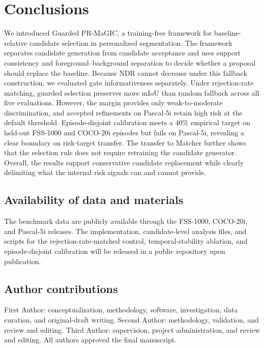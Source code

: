 \documentclass{CVM}
\begin{document}
\section{Conclusions}

We introduced Guarded PR-MaGIC, a training-free framework for baseline-relative candidate selection in personalized segmentation. The framework separates candidate generation from candidate acceptance and uses support consistency and foreground--background separation to decide whether a proposal should replace the baseline. Because NDR cannot decrease under this fallback construction, we evaluated gate informativeness separately. Under rejection-rate matching, guarded selection preserves more mIoU than random fallback across all five evaluations. However, the margin provides only weak-to-moderate discrimination, and accepted refinements on Pascal-5i retain high risk at the default threshold. Episode-disjoint calibration meets a 40\% empirical target on held-out FSS-1000 and COCO-20i episodes but fails on Pascal-5i, revealing a clear boundary on risk-target transfer. The transfer to Matcher further shows that the selection rule does not require retraining the candidate generator. Overall, the results support conservative candidate replacement while clearly delimiting what the internal risk signals can and cannot provide.

\appendix

\subsection*{Availability of data and materials}

The benchmark data are publicly available through the FSS-1000, COCO-20i, and Pascal-5i releases. The implementation, candidate-level analysis files, and scripts for the rejection-rate-matched control, temporal-stability ablation, and episode-disjoint calibration will be released in a public repository upon publication.

\subsection*{Author contributions}

First Author: conceptualization, methodology, software, investigation, data curation, and original-draft writing. Second Author: methodology, validation, and review and editing. Third Author: supervision, project administration, and review and editing. All authors approved the final manuscript.
\end{document}
